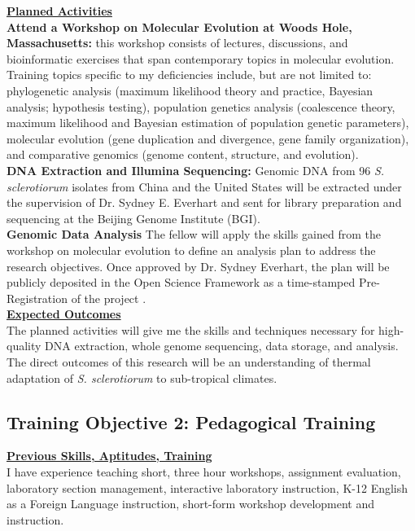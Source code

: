 \documentclass[12pt,letterpaper]{article}
\begin{document}
\noindent \textbf{\underline{Planned Activities}}\\
\noindent \textbf{Attend a Workshop on Molecular Evolution at Woods Hole, Massachusetts:} this workshop consists of lectures, discussions, and bioinformatic exercises that span contemporary topics in molecular evolution. Training topics specific to my deficiencies include, but are not limited to: phylogenetic analysis (maximum likelihood theory and practice, Bayesian analysis; hypothesis testing), population genetics analysis (coalescence theory, maximum likelihood and Bayesian estimation of population genetic parameters), molecular evolution (gene duplication and divergence, gene family organization), and comparative genomics (genome content, structure, and evolution).\\
\noindent \textbf{DNA Extraction and Illumina Sequencing:} Genomic DNA from 96 \textit{S. sclerotiorum} isolates from China and the United States will be extracted under the supervision of Dr. Sydney E. Everhart and sent for library preparation and sequencing at the Beijing Genome Institute (BGI). \\
\noindent \textbf{Genomic Data Analysis} The fellow will apply the skills gained from the workshop on molecular evolution to define an analysis plan to address the research objectives. Once approved by Dr. Sydney Everhart, the plan will be publicly deposited in the Open Science Framework as a time-stamped Pre-Registration of the project \citep{nosek2017osf}.\\

\noindent \textbf{\underline{Expected Outcomes}}\\
The planned activities will give me the skills and techniques necessary for high-quality DNA extraction, whole genome sequencing, data storage, and analysis. The direct outcomes of this research will be an understanding of thermal adaptation of \textit{S. sclerotiorum} to sub-tropical climates.

\subsection{Training Objective 2: Pedagogical Training}

\noindent \textbf{\underline{Previous Skills, Aptitudes, Training}}\\
I have experience teaching short, three hour workshops, assignment evaluation, laboratory section management, interactive laboratory instruction, K-12 English as a Foreign Language instruction, short-form workshop development and instruction.
\end{document}
